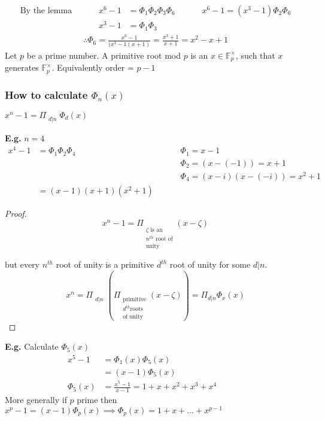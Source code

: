\documentclass[11pt]{article}
\begin{document}
\begin{align*}
	\text{By the lemma} &&&& x^6 -1 &= \Phi_1 \Phi_2 \Phi_3 \Phi_6 &&&& x^6-1 = (x^3 - 1) \Phi_2 \Phi_6 \\
	&&&& x^3 -1 &= \Phi_1 \Phi_3 
\end{align*}
\begin{align*}
	\therefore \Phi_6 = \frac{x^6-1}{(x^3-1(x+1)} = \frac{x^3+1}{x+1} =x^2-x+1
\end{align*}
Let $p$ be a prime number. A primitive root mod $p$ is an $x \in \mathbb{F}_p^{\times}$, such that $x$ generates $\mathbb{F}^\times_p$. Equivalently order = $p-1$

\subsubsection{How to calculate $\Phi_n(x)$}
\begin{lemma}
	$x^n - 1 = \Pi_{\substack{d|n}} \Phi_d(x)$ 
\end{lemma}

\textbf{E.g.} $n=4$
\begin{align*}
	x^4-1 &= \Phi_1 \Phi_2 \Phi_4 && && \Phi_1 = x-1\\
	&&&&& \Phi_2 = (x-(-1)) = x+1\\
	&&&&& \Phi_4 = (x-i)(x-(-i))= x^2+1\\
	& =(x-1)(x+1)(x^2+1)
\end{align*}

\begin{proof}
	\begin{equation*}
x^n - 1 = \Pi_{\substack{\\\zeta \text{ is an }\\ n^{th} \text{ root of}\\ \text{unity}}} (x- \zeta)
	\end{equation*}
		
		but every $n^{th}$ root of unity is a primitive $d^{th}$ root of unity for some $d|n$.\\
	\begin{equation*}
		x^{n} = \Pi_{\substack{d|n} } (\Pi_{\substack{\text{primitive} \\d^{th} \text{roots} \\ \text{of unity} }}  (x-\zeta) )= \Pi_{d|n} \Phi_x (x)
	\end{equation*}
\end{proof}
\newpage
\textbf{E.g.} Calculate $\Phi_5(x)$
\begin{align*}
	x^5-1  &= \Phi_1(x) \Phi_5(x) &&&&\\
	&=(x-1) \Phi_5(x)\\[1em]
	\Phi_5(x) &= \frac{x^5-1}{x-1} = 1+x+x^2+x^3+x^4 
\end{align*}
More generally if $p$ prime then $x^p-1 = (x-1) \Phi_p(x) \implies \Phi_p(x) = 1+x+\dots +x^{p-1}$
\end{document}
